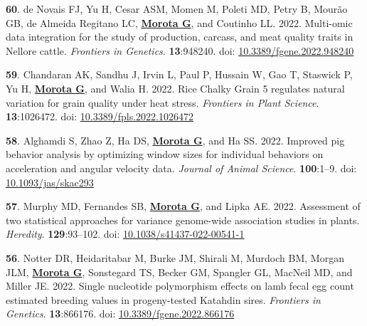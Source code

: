\documentclass[margin,line,10pt]{res}
\newenvironment{list1}{
  \begin{list}{\ding{113}}{%
      \setlength{\itemsep}{0in}
      \setlength{\parsep}{0in} \setlength{\parskip}{0in}
      \setlength{\topsep}{0in} \setlength{\partopsep}{0in} 
      \setlength{\leftmargin}{0.17in}}}{\end{list}}
\begin{document}
\begin{resume}
\begin{list1}
  \vspace{0.5cm}

  \item [{\bf 60}.] de Novais FJ, Yu H, Cesar ASM, Momen M, Poleti MD, Petry B, Mour{\~a}o GB, de Almeida Regitano LC, \textbf{\underline{Morota G}}, and Coutinho LL. 2022. Multi-omic data integration for the study of production, carcass, and meat quality traits in Nellore cattle. \emph{Frontiers in Genetics}. \textbf{13}:948240. doi: \textcolor{blue}{\href{https://doi.org/10.3389/fgene.2022.948240}{10.3389/fgene.2022.948240}} 


  \vspace{0.5cm}

  \item  [{\bf 59}.] Chandaran AK, Sandhu J, Irvin L,  Paul P, Hussain W, Gao T, Staswick P, Yu H, \textbf{\underline{Morota G}}, and Walia H. 2022. Rice Chalky Grain 5 regulates natural variation for grain quality under heat stress. \emph{Frontiers in Plant Science}. \textbf{13}:1026472. doi: \textcolor{blue}{\href{https://doi.org/10.3389/fpls.2022.1026472}{10.3389/fpls.2022.1026472}} 
           
  \vspace{0.5cm}

  \item [{\bf 58}.] Alghamdi S, Zhao Z, Ha DS, \textbf{\underline{Morota G}}, and Ha SS. 2022. Improved pig behavior analysis by optimizing window sizes for individual behaviors on acceleration and angular velocity data. \emph{Journal of Animal Science}. \textbf{100}:1–9. doi: \textcolor{blue}{\href{https://doi.org/10.1093/jas/skac293}{10.1093/jas/skac293}}     

  \vspace{0.5cm}


  \item [{\bf 57}.] Murphy MD, Fernandes SB, \textbf{\underline{Morota G}}, and Lipka AE. 2022. Assessment of two statistical approaches for variance genome-wide association studies in plants. \emph{Heredity}. \textbf{129}:93–102. doi: \textcolor{blue}{\href{https://doi.org/10.1038/s41437-022-00541-1}{10.1038/s41437-022-00541-1}}  


      \vspace{0.5cm}
     
  \item  [{\bf 56}.]  Notter DR, Heidaritabar M, Burke JM, Shirali M, Murdoch BM, Morgan JLM, \textbf{\underline{Morota G}}, Sonstegard TS, Becker GM, Spangler GL, MacNeil MD, and Miller JE. 2022. Single nucleotide polymorphism effects on lamb fecal egg count estimated breeding values in progeny-tested Katahdin sires. \emph{Frontiers in Genetics}. \textbf{13}:866176. doi: \textcolor{blue}{\href{https://doi.org/10.3389/fgene.2022.866176}{10.3389/fgene.2022.866176}}       


\end{list1}
\end{resume}
\end{document}
